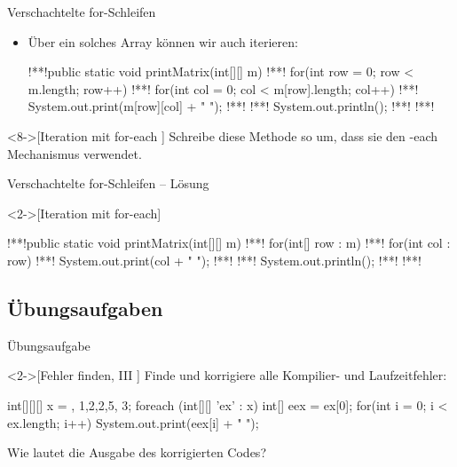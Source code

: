 \begin{frame}[fragile]{Verschachtelte for-Schleifen}
    \begin{itemize}[<+(1)->]
        \widei
        \item Über ein solches Array können wir auch iterieren:\pause{}
\begin{plainjava}
!**!public static void printMatrix(int[][] m){
!**!    for(int row = 0; row < m.length; row++) {
!**!        for(int col = 0; col < m[row].length; col++) {
!**!            System.out.print(m[row][col] + " ");
!**!        }
!**!        System.out.println();
!**!    }
!**!}
\end{plainjava}
    \end{itemize}
    \begin{exercise}<8->[Iteration mit for-each ]
        Schreibe diese Methode so um, dass sie den -each Mechanismus verwendet.
    \end{exercise}
\end{frame}

\begin{frame}[c,fragile]{Verschachtelte for-Schleifen -- Lösung}
    \begin{solve}<2->[Iteration mit for-each]
\begin{plainjava}
!**!public static void printMatrix(int[][] m){
!**!    for(int[] row : m) {
!**!        for(int col : row) {
!**!            System.out.print(col + " ");
!**!        }
!**!        System.out.println();
!**!    }
!**!}
\end{plainjava}
    \end{solve}
\end{frame}

\subsection{Übungsaufgaben}

\begin{frame}[c,fragile]{Übungsaufgabe}
    \begin{exercise}<2->[Fehler finden, III ]
        \pause{}Finde und korrigiere alle Kompilier- und Laufzeitfehler:\pause{}
        \begin{plainvoid}
int[][][] x = {{}, {{1,2},{2},{5}}, {{3}}};
foreach (int[][] 'ex' : x) {
    int[] eex = ex[0];
    for(int i = 0; i < ex.length; i++)
        System.out.print(eex[i] + " ");
}
        \end{plainvoid}
        \pause{}Wie lautet die Ausgabe des korrigierten Codes?
    \end{exercise}
\end{frame}

